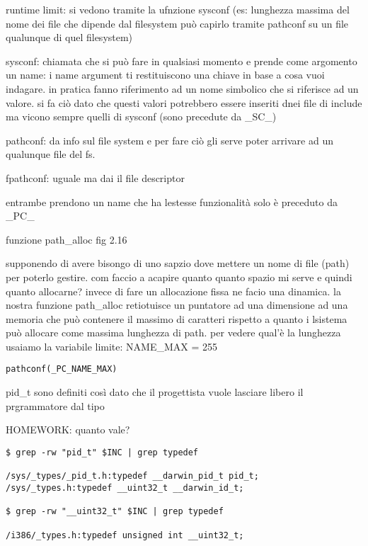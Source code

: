 runtime limit: si vedono tramite la ufnzione sysconf (es: lunghezza massima del nome dei file che dipende dal filesystem può capirlo tramite pathconf su un file qualunque di quel filesystem)

sysconf: chiamata che si può fare in qualsiasi momento e prende come argomento un name: i name argument ti restituiscono una chiave in base a cosa vuoi indagare. in pratica fanno riferimento ad un nome simbolico che si riferisce ad un valore. si fa ciò dato che questi valori potrebbero essere inseriti dnei file di include ma vicono sempre quelli di sysconf (sono precedute da \_SC\_)

pathconf: da info sul file system e per fare ciò gli serve poter arrivare ad un qualunque file del fs.

fpathconf: uguale ma dai il file descriptor

entrambe prendono un name che ha lestesse funzionalità solo è preceduto da \_PC\_




funzione path\_alloc fig 2.16 

supponendo di avere bisongo di uno sapzio dove mettere un nome di file (path) per poterlo gestire. com faccio a acapire quanto quanto spazio mi serve e quindi quanto allocarne? invece di fare un allocazione fissa ne facio una dinamica. la nostra funzione path\_alloc retiotuisce un puntatore ad una dimensione ad una memoria che può contenere il massimo di caratteri rispetto a quanto i lsistema può allocare come massima lunghezza di path. per vedere qual'è la lunghezza usaiamo la variabile limite: NAME\_MAX = 255

\begin{lstlisting}
pathconf(_PC_NAME_MAX)
\end{lstlisting}








pid\_t sono definiti così dato che il progettista vuole lasciare libero il prgrammatore dal tipo 

HOMEWORK: quanto vale?

\begin{lstlisting}
$ grep -rw "pid_t" $INC | grep typedef

/sys/_types/_pid_t.h:typedef __darwin_pid_t pid_t;
/sys/_types.h:typedef __uint32_t __darwin_id_t;

$ grep -rw "__uint32_t" $INC | grep typedef

/i386/_types.h:typedef unsigned int __uint32_t;
\end{lstlisting}

